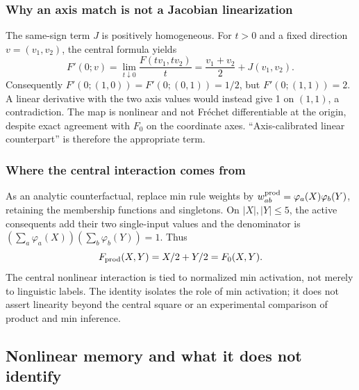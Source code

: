 \subsubsection{Why an axis match is not a Jacobian linearization}
The same-sign term $J$ is positively homogeneous. For $t>0$ and a fixed
direction $v=(v_1,v_2)$, the central formula yields
\begin{equation}
 F'(0;v)=\lim_{t\downarrow0}\frac{F(tv_1,tv_2)}t
 =\frac{v_1+v_2}{2}+J(v_1,v_2).
 \label{eq:fpd_direction}
\end{equation}
Consequently $F'(0;(1,0))=F'(0;(0,1))=1/2$, but
$F'(0;(1,1))=2$. A linear derivative with the two axis values would
instead give 1 on $(1,1)$, a contradiction. The map is nonlinear and not
Fr\'echet differentiable at the origin, despite exact agreement with
$F_0$ on the coordinate axes. ``Axis-calibrated linear counterpart'' is
therefore the appropriate term.

\subsubsection{Where the central interaction comes from}
As an analytic counterfactual, replace min rule weights by
$w^{\rm prod}_{ab}=\varphi_a(X)\varphi_b(Y)$, retaining the membership functions
and singletons. On $|X|,|Y|\le5$, the active consequents add their two
single-input values and the denominator is
$(\sum_a\varphi_a(X))(\sum_b\varphi_b(Y))=1$. Thus
\begin{equation}
 F_{\rm prod}(X,Y)=X/2+Y/2=F_0(X,Y).
 \label{eq:fpd_product}
\end{equation}
The central nonlinear interaction is tied to normalized min activation,
not merely to linguistic labels. The identity isolates the role of min activation; it does not assert
linearity beyond the central square or an experimental comparison of
product and min inference.

\subsection{Nonlinear memory and what it does not identify}

